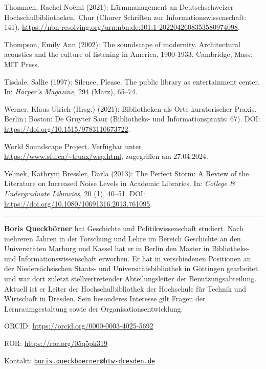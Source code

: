 \documentclass[a4paper,
fontsize=11pt,
oneside,
numbers=noperiodatend,
parskip=half-,
bibliography=totoc,
final
]{scrartcl}
\begin{document}
Thommen, Rachel Noëmi (2021): Lärmmanagement an Deutschschweizer
Hochschulbibliotheken. Chur (Churer Schriften zur
Informationswissenschaft: 141).
\url{https://nbn-resolving.org/urn:nbn:de:101:1-2022042608353580974098}.

Thompson, Emily Ann (2002): The soundscape of modernity. Architectural
acoustics and the culture of listening in America, 1900-1933. Cambridge,
Mass: MIT Press.

Tisdale, Sallie (1997): Silence, Please. The public library as
entertainment center. In: \emph{Harper's Magazine}, 294 (März), 65--74.

Werner, Klaus Ulrich (Hrsg.) (2021): Bibliotheken als Orte kuratorischer
Praxis. Berlin\,; Boston: De Gruyter Saur (Bibliotheks- und
Informationspraxis: 67). DOI:
\url{https://doi.org/10.1515/9783110673722}.

World Soundscape Project. Verfügbar unter
\url{https://www.sfu.ca/~truax/wsp.html}, zugegriffen am 27.04.2024.

Yelinek, Kathryn; Bressler, Darla (2013): The Perfect Storm: A Review of
the Literature on Increased Noise Levels in Academic Libraries. In:
\emph{College \& Undergraduate Libraries}, 20 (1), 40--51. DOI:
\url{https://doi.org/10.1080/10691316.2013.761095}.

\begin{center}\rule{0.5\linewidth}{0.5pt}\end{center}

\textbf{Boris Queckbörner} hat Geschichte und Politikwissenschaft
studiert. Nach mehreren Jahren in der Forschung und Lehre im Bereich
Geschichte an den Universitäten Marburg und Kassel hat er in Berlin den
Master in Bibliotheks- und Informationswissenschaft erworben. Er hat in
verschiedenen Positionen an der Niedersächsischen Staats- und
Universitätsbibliothek in Göttingen gearbeitet und war dort zuletzt
stellvertretender Abteilungsleiter der Benutzungsabteilung. Aktuell ist
er Leiter der Hochschulbibliothek der Hochschule für Technik und
Wirtschaft in Dresden. Sein besonderes Interesse gilt Fragen der
Lernraumgestaltung sowie der Organisationsentwicklung.

ORCID: \url{https://orcid.org/0000-0003-4025-5692}

ROR: \url{https://ror.org/05q5pk319}

Kontakt:
\href{mailto:boris.queckboerner@htw-dresden.de}{\nolinkurl{boris.queckboerner@htw-dresden.de}}
\end{document}
